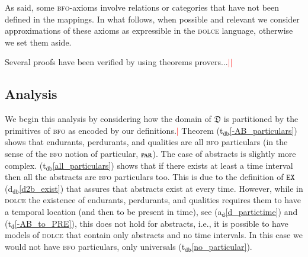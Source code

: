 \documentclass[ao]{iosart2x}
\newcommand{\nb}[1]{\textcolor{red}{$|$}\marginpar{\hspace*{-0cm}\parbox{20mm}{\scriptsize\raggedright\textcolor{red}{#1}}}}
\newcommand{\bfoDefLabel}{\textrm{d$_\texttt{b}$}}
\newcommand{\dolceAxLabel}{\textrm{a$_\texttt{d}$}}
\newcommand{\dolceThrLabel}{\textrm{t$_\texttt{d}$}}
\newcommand{\dbDefLabel}{\textrm{d$_\texttt{db}$}}
\newcommand{\dbThrLabel}{\textrm{t$_\texttt{db}$}}
\newcommand{\refdolceax}[1]{({\dolceAxLabel}\ref{#1})}
\newcommand{\refdolceth}[1]{({\dolceThrLabel}\ref{#1})}
\newcommand{\refbfodf}[1]{({\bfoDefLabel}\ref{#1})}
\newcommand{\refdbdf}[1]{({\dbDefLabel}\ref{#1})}
\newcommand{\refdbth}[1]{({\dbThrLabel}\ref{#1})}
\newcommand{\pr}[1]{\mathtt{#1}}
\newcommand{\cn}[1]{\mathtt{#1}}
\newcommand\textequal{%
 \rule[.08ex]{5pt}{0.35pt}\llap{\rule[.78ex]{5pt}{0.35pt}}}
\newcommand{\sdef}{{\hspace{1.5pt}:\hspace{-2.5pt}\textequal\hspace{3pt}}}
\newcommand{\dolce}{{\textsc{dolce}}}
\newcommand{\bfo}{{\textsc{bfo}}}
\newcommand {\thdolce} {\ensuremath{\mathfrak{D}}}
\newcommand {\thdolcedbmap} {\ensuremath{\mathfrak{D}_\texttt{b}}}
\newcommand{\bfopartic}{\textsc{par}}
\newcommand{\bfoexist}{\pr{EX}}
\newcommand{\bfoiof}[1]{{\,::_{#1\:\!}}}
\begin{document}

As said, %
some {\bfo}-axioms involve relations or categories that have not been defined in the mappings. In what follows, when possible and relevant we consider approximations of these axioms as expressible in the {\dolce} language, otherwise we set them aside.



{\color{red}Several proofs have been verified by using theorems provers...}\nb{CM: forse aggiungere qualche dettaglio su quanti assiomi sono stati preservati e quanti no, ecc. / poi rimandare al deliverable per i dettagli}\nb{SB: basterebbe dare qualche esempio e poi rimandare al deliverable}

\subsection{Analysis}\label{sect_analysis_d2b}

We begin this analysis by considering how the domain of $\thdolce$ is partitioned by the primitives of {\bfo} as encoded by our definitions.\nb{SB: non mi tornava la frase che c'era e l'ho riscritta, va bene così?} 
Theorem \refdbth{-AB_particulars} shows that endurants, perdurants, and qualities are all {\bfo} particulars (in the sense of the {\bfo} notion of particular, $\bfopartic$). The case of abstracts is slightly more complex. \refdbth{all_particulars} shows that if there exists at least a time interval then all the abstracts are {\bfo} particulars too. This is due to the definition of $\bfoexist$ \refdbdf{d2b_exist} that assures that abstracts exist at every time. However, while in {\dolce} the existence of endurants, perdurants, and qualities requires them to have a temporal location (and then to be present in time), see \refdolceax{d_partictime} and \refdolceth{-AB_to_PRE}, this does not hold for abstracts, i.e., it is possible to have models of {\dolce} that contain only abstracts and no time intervals. In this case we would not have {\bfo} particulars, only universals \refdbth{no_particular}.
\end{document}
